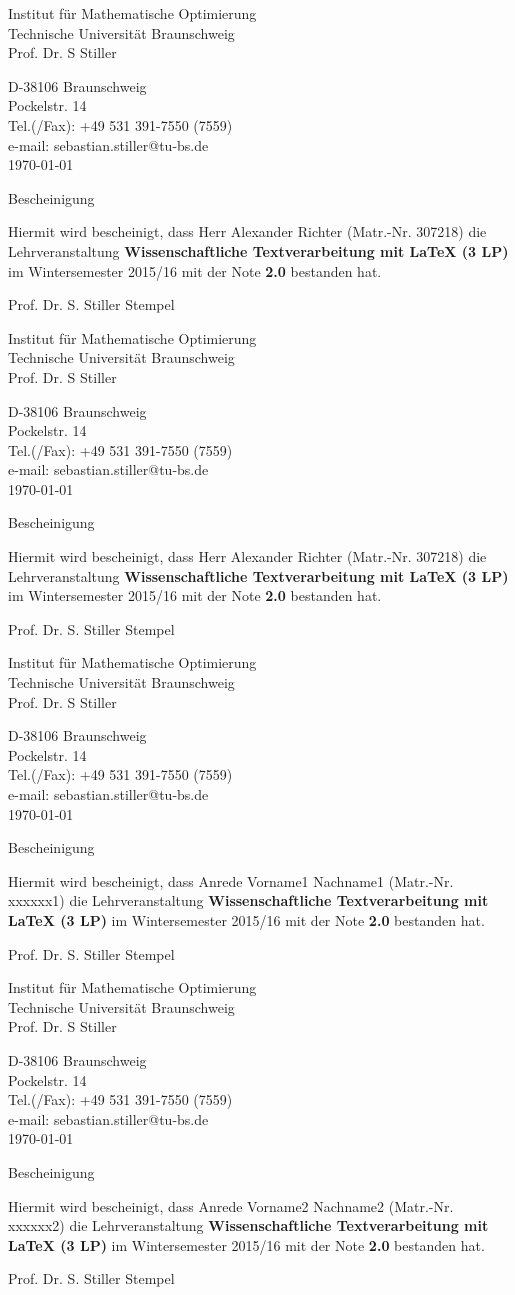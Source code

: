 \documentclass[	a4paper,      %
	       ]{article}    %
\makeatletter
\newcommand{\latexSchein}[5]{%
Institut f\"ur Mathematische Optimierung\\
Technische Universit\"at Braunschweig\\
Prof. Dr. S Stiller\par\bigskip
D-38106 Braunschweig\\
 Pockelstr. 14\\
 Tel.(/Fax): +49 531 391-7550 (7559)\\
 e-mail: sebastian.stiller@tu-bs.de\\
 \today{} \par \bigskip
Bescheinigung\par \bigskip
Hiermit wird bescheinigt, dass #3 #1 #2 (Matr.-Nr. #4) die Lehrveranstaltung \textbf{Wissenschaftliche Textverarbeitung mit \LaTeX{} (3 LP)} 
im Wintersemester 2015/16 mit der Note \textbf{#5} bestanden hat.\par \bigskip
Prof. Dr. S. Stiller \hfill Stempel
}%
\makeatother
\begin{document}
\latexSchein{Alexander}{Richter}{Herr}{307218}{2.0}
\vfill
\latexSchein{Alexander}{Richter}{Herr}{307218}{2.0}
\clearpage
\latexSchein{Vorname1}{Nachname1}{Anrede}{xxxxxx1}{2.0}
\vfill
\latexSchein{Vorname2}{Nachname2}{Anrede}{xxxxxx2}{2.0}
\clearpage
%
%
\end{document}
